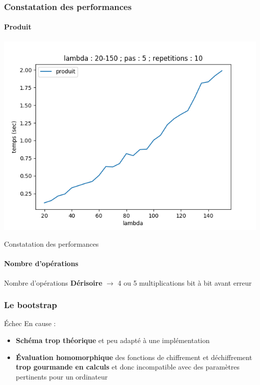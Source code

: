 \begin{frame}
\frametitle{Constatation des performances}
\framesubtitle{Produit}
\begin{center}
\includegraphics[scale=0.46]{images/produit.png} 
\end{center}
\end{frame}

\begin{frame}{Constatation des performances}
\framesubtitle{Nombre d'opérations}
    \begin{alertblock}{Nombre d'opérations}
    \textbf{Dérisoire} $\to$ 4 ou 5 multiplications bit à bit avant erreur
    \end{alertblock}{}
\end{frame}{}


\begin{frame}
\frametitle{Le bootstrap}
\begin{alertblock}{Échec}
En cause :
\begin{itemize}
    \item \textbf{Schéma trop théorique} et peu adapté à une implémentation
    \item \textbf{Évaluation homomorphique} des fonctions de chiffrement et déchiffrement \textbf{trop gourmande en calculs} et donc incompatible avec des paramètres pertinents pour un ordinateur
\end{itemize}{}
    \end{alertblock}
\end{frame}